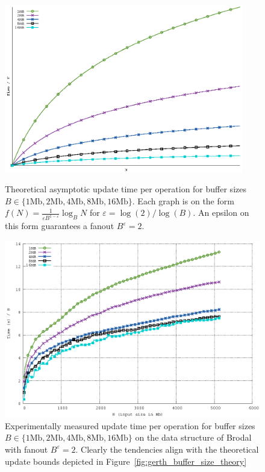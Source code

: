 \documentclass[twoside,11pt,openright]{report}
\def \epsilon {\varepsilon}
\begin{document}
\begin{figure}[htp]
\centering
\includegraphics[width=0.93\textwidth]{../plots/gerth_update_buffer_size/gerth_buffer_size}
\caption{Theoretical asymptotic update time per operation for buffer sizes \\ $B \in \{1 \text{Mb}, 2 \text{Mb}, 4 \text{Mb}, 8 \text{Mb}, 16 \text{Mb} \}$. Each graph is on the form $f(N) = \frac{1}{\epsilon B^{1-\epsilon}} \log_B N$ for $\epsilon = \log(2) / \log(B)$. An epsilon on this form guarantees a fanout $B^\epsilon = 2$.}
\label{fig:gerth_buffer_size_theory}

\includegraphics[width=\textwidth]{../src/experiments/gerth_buffer_size_experiment_results/2016-05-03.13_51_54/time}
\caption{Experimentally measured update time per operation for buffer sizes \\ $B \in \{1 \text{Mb}, 2 \text{Mb}, 4 \text{Mb}, 8 \text{Mb}, 16 \text{Mb} \}$ on the data structure of Brodal with fanout $B^\epsilon = 2$. Clearly the tendencies align with the theoretical update bounds depicted in Figure~\ref{fig:gerth_buffer_size_theory}}
\label{fig:gerth_buffer_size_experiment}
\end{figure}
\end{document}
